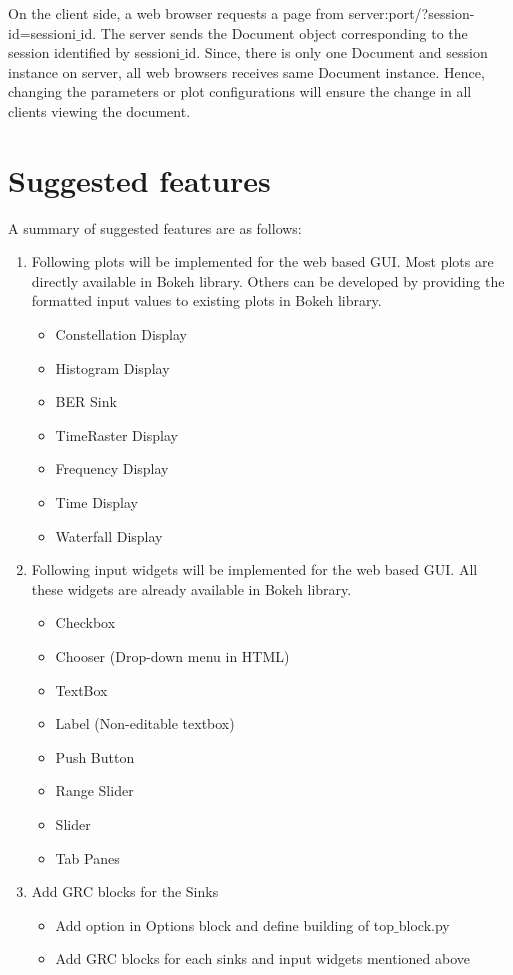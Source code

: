 \documentclass[a4paper, 11pt]{article}
\begin{document}
On the client side, a web browser requests a page from server:port/?session-id=sessioni$\_$id. The server sends the Document object corresponding to the session identified by sessioni$\_$id. Since, there is only one Document and session instance on server, all web browsers receives same Document instance. Hence, changing the parameters or plot configurations will ensure the change in all clients viewing the document.

\section{Suggested features}
A summary of suggested features are as follows:

\begin{enumerate}
\item Following plots will be implemented for the web based GUI. Most plots are directly available in Bokeh library. Others can be developed by providing the formatted input values to existing plots in Bokeh library.
\begin{itemize}
\item Constellation Display
\item Histogram Display
\item BER Sink
\item TimeRaster Display
\item Frequency Display
\item Time Display
\item Waterfall Display
\end{itemize}

\item Following input widgets will be implemented for the web based GUI. All these widgets are already available in Bokeh library.
\begin{itemize}
\item Checkbox
\item Chooser (Drop-down menu in HTML)
\item TextBox
\item Label (Non-editable textbox)
\item Push Button
\item Range Slider
\item Slider
\item Tab Panes
\end{itemize}

\item Add GRC blocks for the Sinks
\begin{itemize}
\item Add option in Options block and define building of top$\_$block.py
\item Add GRC blocks for each sinks and input widgets mentioned above
\end{itemize}
\end{enumerate}
\end{document}
